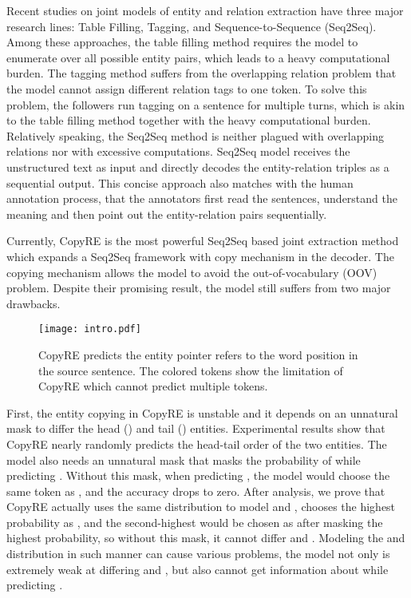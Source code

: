 \documentclass[letterpaper]{article} \usepackage{aaai20}  \usepackage{times}  \usepackage{helvet} \usepackage{courier}  \usepackage[hyphens]{url}  \usepackage{graphicx}
\begin{document}
  Recent studies on joint models of entity and relation extraction have three major research lines: Table Filling, Tagging, and Sequence-to-Sequence (Seq2Seq). Among these approaches, the table filling method \cite{table_filling,crf_norm} requires the model to enumerate over all possible entity pairs, which leads to a heavy computational burden. 
The tagging method \cite{novel_tagging} suffers from the overlapping relation problem that the model cannot assign different relation tags to one token. To solve this problem, the followers \cite{rlre,tag2table} run tagging on a sentence for multiple turns, which is akin to the table filling method together with the heavy computational burden. 
Relatively speaking, the Seq2Seq method is neither plagued with overlapping relations nor with excessive computations.
  Seq2Seq model receives the unstructured text as input and directly decodes the entity-relation triples as a sequential output. 
This concise approach also matches with the human annotation process, that the annotators first read the sentences, understand the meaning and then point out the entity-relation pairs sequentially.
  
   Currently, CopyRE \cite{CopyRE} is the most powerful Seq2Seq based joint extraction method which expands a Seq2Seq framework with copy mechanism in the decoder. The copying mechanism allows the model to avoid the out-of-vocabulary (OOV) problem. Despite their promising result, the model still suffers from two major drawbacks. 
\begin{figure}[t]
  \centering
  \texttt{[image: intro.pdf]}
  \caption{CopyRE predicts the entity pointer refers to the word position in the source sentence. The colored tokens show the limitation of CopyRE which cannot predict multiple tokens.}
  \label{intro}
  \end{figure}


First, the entity copying in CopyRE is unstable and it depends on an unnatural mask to differ the head () and tail () entities. Experimental results show that CopyRE nearly randomly predicts the head-tail order of the two entities. The model also needs an unnatural mask that masks the probability of  while predicting . Without this mask, when predicting , the model would choose the same token as , and the accuracy drops to zero. 
After analysis, we prove that CopyRE actually uses the same distribution to model  and , chooses the highest probability as , and the second-highest would be chosen as  after masking the highest probability, so without this mask, it cannot differ  and . Modeling the  and  distribution in such manner can cause various problems, the model not only is extremely weak at differing  and , but also cannot get information about  while predicting .
  
\end{document}
